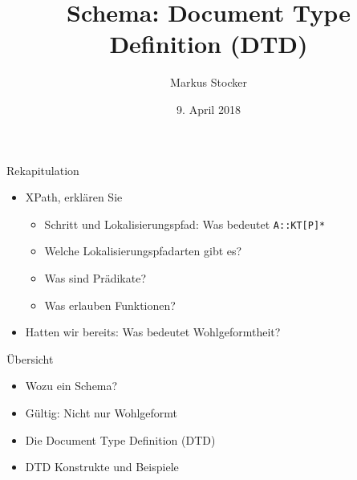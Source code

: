\documentclass{beamer}
\title{Schema: Document Type Definition (DTD)}
\author{Markus Stocker}
\date{9. April 2018}
\begin{document}
\maketitle

\begin{frame}{Rekapitulation}
	
	\begin{itemize}
		\item XPath, erklären Sie
		\begin{itemize}
			\item Schritt und Lokalisierungspfad: Was bedeutet \texttt{A::KT[P]*}
			\item Welche Lokalisierungspfadarten gibt es?
			\item Was sind Prädikate?
			\item Was erlauben Funktionen?
		\end{itemize}
		\item Hatten wir bereits: Was bedeutet Wohlgeformtheit?
	\end{itemize}
	
\end{frame}

\begin{frame}{Übersicht}
	
	\begin{itemize}
		\item Wozu ein Schema?
		\item Gültig: Nicht nur Wohlgeformt
		\item Die Document Type Definition (DTD)
		\item DTD Konstrukte und Beispiele
	\end{itemize}
	
\end{frame}
\end{document}
